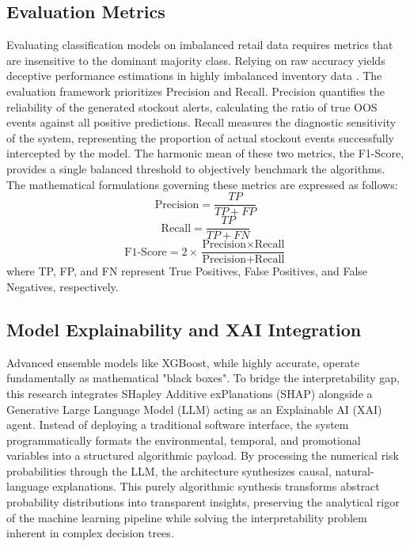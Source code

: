 \documentclass[11pt, a4paper]{article}
\begin{document}
\subsection{Evaluation Metrics}
Evaluating classification models on imbalanced retail data requires metrics that are insensitive to the dominant majority class. Relying on raw accuracy yields deceptive performance estimations in highly imbalanced inventory data \cite{boute2021}. The evaluation framework prioritizes Precision and Recall\cite{he2009imbalanced}. Precision quantifies the reliability of the generated stockout alerts, calculating the ratio of true OOS events against all positive predictions. Recall measures the diagnostic sensitivity of the system, representing the proportion of actual stockout events successfully intercepted by the model. The harmonic mean of these two metrics, the F1-Score\cite{he2009imbalanced}, provides a single balanced threshold to objectively benchmark the algorithms. The mathematical formulations governing these metrics are expressed as follows:
\begin{equation}
    \text{Precision} = \frac{TP}{TP + FP}
\end{equation}
\begin{equation}
    \text{Recall} = \frac{TP}{TP + FN}
\end{equation}
\begin{equation}
    \text{F1-Score} = 2 \times \frac{\text{Precision} \times \text{Recall}}{\text{Precision} + \text{Recall}}
\end{equation}
where TP, FP, and FN represent True Positives, False Positives, and False Negatives, respectively.

\subsection{Model Explainability and XAI Integration}
Advanced ensemble models like XGBoost, while highly accurate, operate fundamentally as mathematical "black boxes". To bridge the interpretability gap, this research integrates SHapley Additive exPlanations (SHAP) \cite{lundberg2017shap} alongside a Generative Large Language Model (LLM) acting as an Explainable AI (XAI) agent. Instead of deploying a traditional software interface, the system programmatically formats the environmental, temporal, and promotional variables into a structured algorithmic payload. By processing the numerical risk probabilities through the LLM, the architecture synthesizes causal, natural-language explanations. This purely algorithmic synthesis transforms abstract probability distributions into transparent insights, preserving the analytical rigor of the machine learning pipeline while solving the interpretability problem inherent in complex decision trees.
\end{document}
